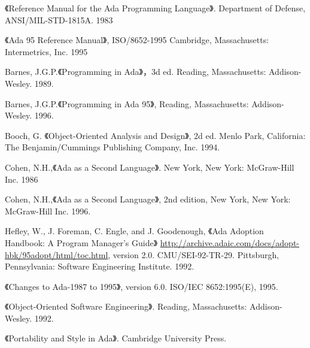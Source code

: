 %
%
%

\cleardoublepage
{}
\begin{thebibliography}{widest-label}\label{bib}

 《Reference Manual for the Ada Programming
Language》. Department of Defense, ANSI/MIL-STD-1815A. 1983

 《Ada 95 Reference Manual》,
ISO/8652-1995 Cambridge, Massachusetts: Intermetrics, Inc. 1995

 Barnes, J.G.P.《Programming in Ada》，3d ed.
Reading, Massachusetts: Addison-Wesley. 1989.

 Barnes, J.G.P.《Programming in Ada 95》,
Reading, Massachusetts: Addison-Wesley. 1996.

 Booch, G. 《Object-Oriented Analysis and
Design》, 2d ed. Menlo Park, California: The Benjamin/Cummings Publishing
Company, Inc. 1994.

 Cohen, N.H.,《Ada as a Second Language》.
 New York, New York: McGraw-Hill Inc. 1986

 Cohen, N.H.,《Ada as a Second Language》,
2nd edition, New York, New York: McGraw-Hill Inc. 1996.

 Hefley, W., J. Foreman, C. Engle, and
J. Goodenough, 《Ada Adoption Handbook: A Program Manager's Guide》
\url{http://archive.adaic.com/docs/adopt-hbk/95adopt/html/toc.html},
version 2.0. CMU/SEI-92-TR-29. Pittsburgh, Pennsylvania:
Software Engineering Institute. 1992.

 《Changes to Ada-1987 to 1995》,
version 6.0. ISO/IEC 8652:1995(E), 1995.

 《Object-Oriented Software
Engineering》. Reading, Massachusetts: Addison-Wesley. 1992.


 《Portability and Style in Ada》.
Cambridge University Press.


\end{thebibliography}
